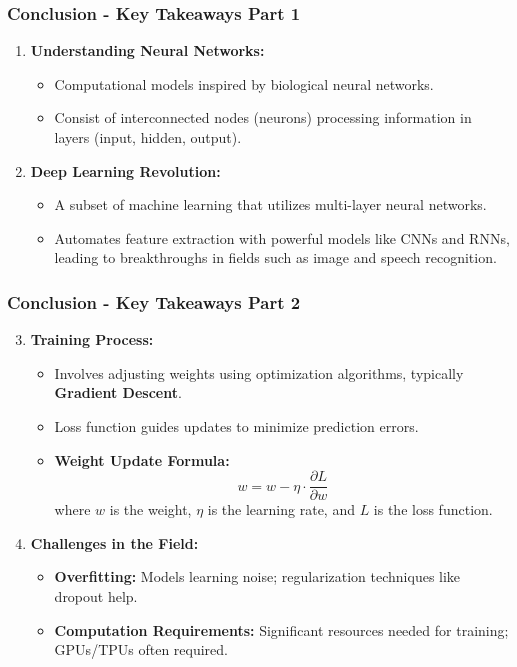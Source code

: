 \documentclass[aspectratio=169]{beamer}
\begin{document}
\begin{frame}[fragile]
    \frametitle{Conclusion - Key Takeaways Part 1}
    
    \begin{enumerate}
        \item \textbf{Understanding Neural Networks:}
        \begin{itemize}
            \item Computational models inspired by biological neural networks.
            \item Consist of interconnected nodes (neurons) processing information in layers (input, hidden, output).
        \end{itemize}
        
        \item \textbf{Deep Learning Revolution:}
        \begin{itemize}
            \item A subset of machine learning that utilizes multi-layer neural networks.
            \item Automates feature extraction with powerful models like CNNs and RNNs, leading to breakthroughs in fields such as image and speech recognition.
        \end{itemize}
    \end{enumerate}
\end{frame}

\begin{frame}[fragile]
    \frametitle{Conclusion - Key Takeaways Part 2}

    \begin{enumerate}
        \setcounter{enumi}{2}
        \item \textbf{Training Process:}
        \begin{itemize}
            \item Involves adjusting weights using optimization algorithms, typically \textbf{Gradient Descent}.
            \item Loss function guides updates to minimize prediction errors.
            \item \textbf{Weight Update Formula:}
            \begin{equation}
                w = w - \eta \cdot \frac{\partial L}{\partial w}
            \end{equation}
            where \(w\) is the weight, \(\eta\) is the learning rate, and \(L\) is the loss function.
        \end{itemize}

        \item \textbf{Challenges in the Field:}
        \begin{itemize}
            \item \textbf{Overfitting:} Models learning noise; regularization techniques like dropout help.
            \item \textbf{Computation Requirements:} Significant resources needed for training; GPUs/TPUs often required.
        \end{itemize}
    \end{enumerate}
\end{frame}
\end{document}
